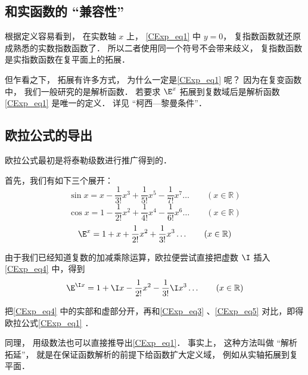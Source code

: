 \subsection{和实函数的 “兼容性”}
根据定义容易看到， 在实数轴 $x$ 上， \autoref{CExp_eq1} 中 $y = 0$， 复指数函数就还原成熟悉的实数指数函数了． 所以二者使用同一个符号不会带来歧义， 复指数函数是实指数函数在复平面上的拓展．

但乍看之下， 拓展有许多方式， 为什么一定是\autoref{CExp_eq1} 呢？ 因为在复变函数中， 我们一般研究的是解析函数． 若要求 $\E^x$ 拓展到复数域后是解析函数\autoref{CExp_eq1} 是唯一的定义． 详见 “柯西—黎曼条件”．

\subsection{欧拉公式的导出}


欧拉公式最初是将泰勒级数进行推广得到的．

首先，我们有如下三个展开：
\begin{equation}\label{CExp_eq3}
\sin x = x - \frac{1}{3!} x^3 + \frac{1}{5!} x^5 - \frac{1}{7!} x^7 \ldots
\qquad (x \in \mathbb R)
\end{equation}
\begin{equation}\label{CExp_eq5}
\cos x = 1 - \frac{1}{2!} x^2 + \frac{1}{4!} x^4 -\frac{1}{6!} x^6 \ldots
\qquad (x \in \mathbb R)
\end{equation}
\begin{equation}
\E^x =1 + x + \frac{1}{2!} x^2 + \frac{1}{3!} x^3  \ldots
\qquad (x \in \mathbb R)
\end{equation}

由于我们已经知道复数的加减乘除运算，欧拉便尝试直接把虚数 $\I$ 插入\autoref{CExp_eq4}  中，得到
\begin{equation}\label{CExp_eq4}
\E^{\I x} =1 + \I x - \frac{1}{2!} x^2 - \frac{1}{3!} \I x^3  \ldots
\qquad (x \in \mathbb R)
\end{equation}

把\autoref{CExp_eq4} 中的实部和虚部分开，再和\autoref{CExp_eq3} 、\autoref{CExp_eq5} 对比，即得欧拉公式\autoref{CExp_eq1} ．

同理， 用级数法也可以直接推导出\autoref{CExp_eq1}． 事实上， 这种方法叫做 “解析拓延”， 就是在保证函数解析的前提下给函数扩大定义域， 例如从实轴拓展到复平面．
